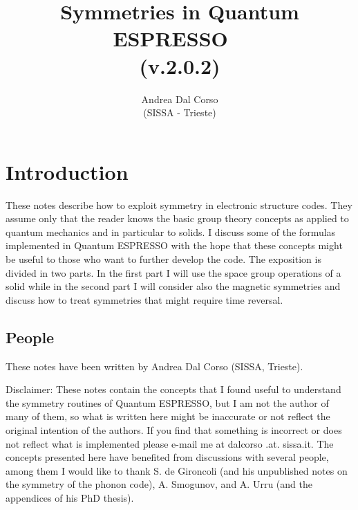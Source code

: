 \documentclass[12pt,a4paper,twoside]{report}
\def\version{2.0.2}
\begin{document}
\author{Andrea Dal Corso \\ (SISSA - Trieste)}
\date{}

\title{
  \vspace{3truecm}
  \Huge \color{dark-blue} Symmetries in Quantum ESPRESSO \ \\
   (v.\version)
}

\maketitle

\newpage

\tableofcontents

\newpage

\newpage
{\color{dark-blue}\chapter{Introduction}}
These notes describe how to exploit symmetry in electronic structure codes. They assume only that the reader knows the basic group theory concepts as applied to quantum mechanics and in particular to solids. I discuss some of the formulas implemented in Quantum ESPRESSO with the hope that these concepts might be useful to those who want to further develop the code. The exposition is divided in two parts. In the first part I will use the space group operations of a solid while in the second part I will consider also the magnetic symmetries and discuss how to treat symmetries that might require time reversal. 


\newpage
\section{People}
These notes have been written by Andrea Dal Corso (SISSA, Trieste). 

Disclaimer: These notes contain the concepts that I found useful to understand the symmetry routines of Quantum ESPRESSO, but I am not the author of many of them, so what is written here might be inaccurate or not reflect the original intention of the authors. If you find that something is incorrect or does not reflect what is implemented please e-mail me at dalcorso .at. sissa.it. 
The concepts presented here have benefited from discussions with several people, among them I would like to thank S. de Gironcoli (and his unpublished notes on the symmetry of the phonon code), A. Smogunov, and A. Urru (and the appendices of his PhD thesis). 
\end{document}
